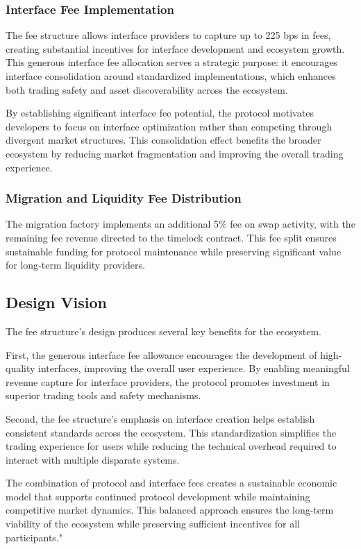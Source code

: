 \documentclass[sigconf,nonacm,prologue,table]{acmart}
\numberwithin{equation}{section}
\theoremstyle{definition}
\theoremstyle{remark}
\begin{document}
\subsubsection{Interface Fee Implementation}

The fee structure allows interface providers to capture up to 225 bps in fees, creating substantial incentives for interface development and ecosystem growth. This generous interface fee allocation serves a strategic purpose: it encourages interface consolidation around standardized implementations, which enhances both trading safety and asset discoverability across the ecosystem.

By establishing significant interface fee potential, the protocol motivates developers to focus on interface optimization rather than competing through divergent market structures. This consolidation effect benefits the broader ecosystem by reducing market fragmentation and improving the overall trading experience.

\subsubsection{Migration and Liquidity Fee Distribution}
The migration factory implements an additional 5\% fee on swap activity, with the remaining fee revenue directed to the timelock contract. This fee split ensures sustainable funding for protocol maintenance while preserving significant value for long-term liquidity providers.

\subsection{Design Vision}
The fee structure's design produces several key benefits for the ecosystem.

First, the generous interface fee allowance encourages the development of high-quality interfaces, improving the overall user experience. By enabling meaningful revenue capture for interface providers, the protocol promotes investment in superior trading tools and safety mechanisms.

Second, the fee structure's emphasis on interface creation helps establish consistent standards across the ecosystem. This standardization simplifies the trading experience for users while reducing the technical overhead required to interact with multiple disparate systems.

The combination of protocol and interface fees creates a sustainable economic model that supports continued protocol development while maintaining competitive market dynamics. This balanced approach ensures the long-term viability of the ecosystem while preserving sufficient incentives for all participants."
\end{document}
